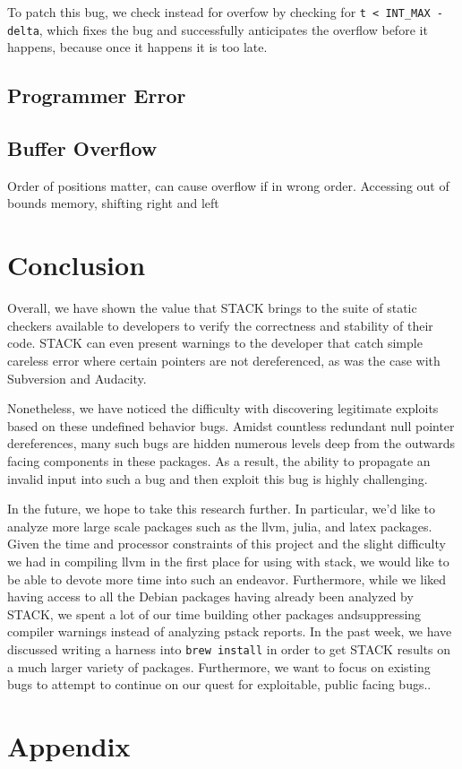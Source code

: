 \documentclass[9pt,twocolumn]{article}
\begin{document}
To patch this bug, we check instead for overfow by checking for \texttt{t < INT\_MAX - delta}, which fixes the bug and successfully anticipates the overflow before it happens, because once it happens it is too late.



\subsection{Programmer Error}

\subsection{Buffer Overflow}

Order of positions matter, can cause overflow if in wrong order. Accessing out of bounds memory, shifting right and left



\section{Conclusion}
\label{sec:conclusion}
Overall, we have shown the value that STACK brings to the suite of static
checkers available to developers to verify the correctness and stability of
their code. STACK can even present warnings to the developer that catch simple
careless error where certain pointers are not dereferenced, as was the case
with Subversion and Audacity.

Nonetheless, we have noticed the difficulty with discovering legitimate
exploits based on these undefined behavior bugs. Amidst countless redundant
null pointer dereferences, many such bugs are hidden numerous levels deep from
the outwards facing components in these packages. As a result, the ability to
propagate an invalid input into such a bug and then exploit this bug is highly
challenging.

In the future, we hope to take this research further. In particular, we'd like
to analyze more large scale packages such as the llvm, julia, and latex
packages. Given the time and processor constraints of this project and the
slight difficulty we had in compiling llvm in the first place for using with
stack, we would like to be able to devote more time into such an endeavor.
Furthermore, while we liked having access to all the Debian packages having
already been analyzed by STACK, we spent a lot of our time building other
packages andsuppressing compiler warnings instead of analyzing pstack reports.
In the past week, we have discussed writing a harness into \texttt{brew
install} in order to get STACK results on a much larger variety of packages.
Furthermore, we want to focus on existing bugs to attempt to continue on our
quest for exploitable, public facing bugs..



\section{Appendix}
\label{sec:appendix}
\end{document}
